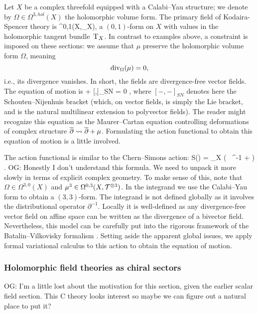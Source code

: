 \documentclass[11pt]{amsart}
\def\del{\partial}
\def\owen#1{{\textcolor{violet!50!black}{OG: {#1}}}}
\begin{document}
Let $X$ be a complex threefold equipped with a Calabi--Yau structure; we denote by $\Omega \in \Omega^{3,hol}(X)$ the holomorphic volume form.
The primary field of Kodaira-Spencer theory is 
\beqn
\mu \in \Omega^{0,1}(X,\T_X),
\eeqn 
a $(0,1)$-form  on $X$ with values in the holomorphic tangent bundle~${\rm T}_X$.
In contrast to examples above, a constraint is imposed on these sections:
we assume that $\mu$ preserve the holomorphic volume form $\Omega$, meaning 
\[
{\rm div}_\Omega(\mu) = 0,
\]
i.e., its divergence vanishes.
In short, the fields are divergence-free vector fields.
The equation of motion is 
\beqn
\dbar \mu +  [\mu,\mu]_{SN} = 0 ,
\eeqn
where $[-,-]_{SN}$ denotes here the Schouten--Nijenhuis bracket 
(which, on vector fields, is simply the Lie bracket, and is the natural multilinear extension to polyvector fields).
The reader might recognize this equation as the Maurer--Cartan equation controlling deformations of complex structure ${\overline{\partial}}\rightsquigarrow {\overline{\partial}} + \mu$.
Formulating the action functional to obtain this equation of motion is a little involved.

The action functional is similar to the Chern--Simons action:
\beqn\label{eqn:KS1}
S(\mu) = \int_X \left(  \mu\, \dbar \del^{-1} \mu +  \mu \wedge \mu \wedge \mu \right) .
\eeqn
\owen{Honestly I don't understand this formula. We need to unpack it more slowly in terms of explicit complex geometry.}
To make sense of this, 
note that $\Omega \in \Omega^{3,0}(X)$ and $\mu^3 \in \Omega^{0,3}(X, \mathcal T^{\otimes 3})$.
In the integrand we use the Calabi--Yau form to obtain a $(3,3)$-form.
The integrand is not defined globally as it involves the distributional operator $\del^{-1}$.
Locally it is well-defined as any divergence-free vector field on affine space can be written as the divergence of a bivector field.
Nevertheless, this model can be carefully put into the rigorous framework of the Batalin--Vilkovisky formalism \cite{CLbcov1}.
Setting aside the apparent global issues, 
we apply formal variational calculus to this action to obtain the equation of motion.


\subsubsection{Holomorphic field theories as chiral sectors}

\owen{I'm a little lost about the motivation for this section, 
given the earlier scalar field section. This C theory looks interest so maybe we can figure out a natural place to put it?}
\end{document}
